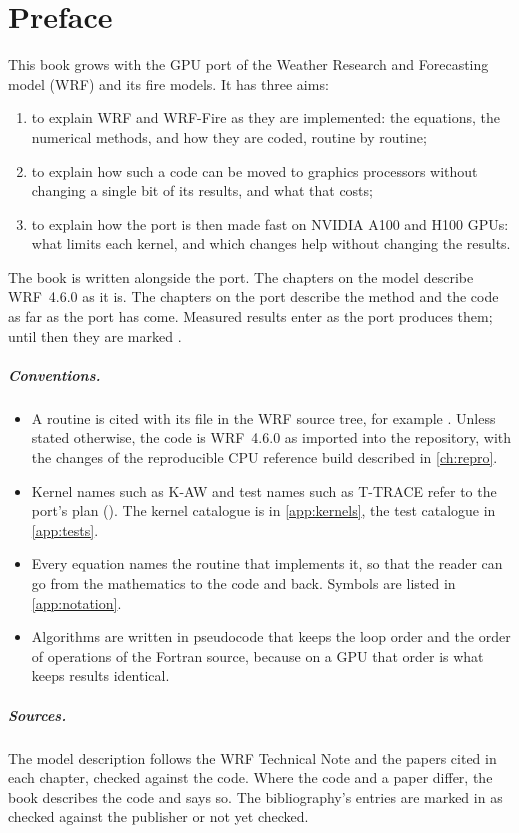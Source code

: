 \chapter*{Preface}

This book grows with the GPU port of the Weather Research and Forecasting model (WRF) and its fire models. It has
three aims:
\begin{enumerate}
  \item to explain WRF and WRF-Fire as they are implemented: the equations, the numerical methods, and how they are
    coded, routine by routine;
  \item to explain how such a code can be moved to graphics processors without changing a single bit of its
    results, and what that costs;
  \item to explain how the port is then made fast on NVIDIA A100 and H100 GPUs: what limits each kernel, and which
    changes help without changing the results.
\end{enumerate}

The book is written alongside the port. The chapters on the model describe WRF~4.6.0 as it is. The chapters on the
port describe the method and the code as far as the port has come. Measured results enter as the port produces
them; until then they are marked \tbr.

\paragraph{Conventions.}
\begin{itemize}
  \item A routine is cited with its file in the WRF source tree, for example
    . Unless stated otherwise, the code is WRF~4.6.0 as imported into
    the repository, with the changes of the reproducible CPU reference build described in \cref{ch:repro}.
  \item Kernel names such as K-AW and test names such as T-TRACE refer to the port's plan (). The
    kernel catalogue is in \cref{app:kernels}, the test catalogue in \cref{app:tests}.
  \item Every equation names the routine that implements it, so that the reader can go from the mathematics to the
    code and back. Symbols are listed in \cref{app:notation}.
  \item Algorithms are written in pseudocode that keeps the loop order and the order of operations of the Fortran
    source, because on a GPU that order is what keeps results identical.
\end{itemize}

\paragraph{Sources.} The model description follows the WRF Technical Note \citep{skamarock2019} and the papers
cited in each chapter, checked against the code. Where the code and a paper differ, the book describes the code and
says so. The bibliography's entries are marked in  as checked against the publisher or not yet
checked.

